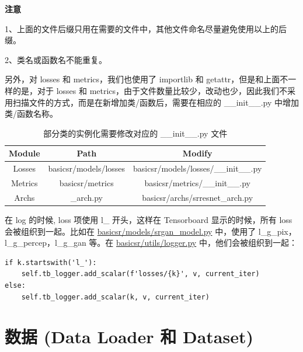 \documentclass[../main.tex]{subfiles}
\begin{document}
\begin{hl} %
    \textbf{注意}

    1、上面的文件后缀只用在需要的文件中，其他文件命名尽量避免使用以上的后缀。

    2、类名或函数名不能重复。
\end{hl}

另外，对 losses 和 metrics，我们也使用了 importlib 和 getattr，但是和上面不一样的是，对于 losses 和 metrics，由于文件数量比较少，改动也少，因此我们不采用扫描文件的方式，而是在新增加类/函数后，需要在相应的 \_\_init\_\_.py 中增加类/函数名称。
\begin{table}[h]
    \centering
    \begin{tabular}{|c|c|c|}
        \hline
        \textbf{Module} & \textbf{Path}         & \textbf{Modify}                       \\ \hline
        Losses          & basicsr/models/losses & basicsr/models/losses/\_\_init\_\_.py \\ \hline
        Metrics         & basicsr/metrics       & basicsr/metrics/\_\_init\_\_.py       \\ \hline
        Archs           & \_arch.py             & basicsr/archs/srresnet\_arch.py       \\ \hline
    \end{tabular}
    \caption{部分类的实例化需要修改对应的 \_\_init\_\_.py 文件}
\end{table}

在 log 的时候, loss 项使用 l\_ 开头，这样在 Tensorboard 显示的时候，所有 loss 会被组织到一起。比如在 \href{https://github.com/XPixelGroup/BasicSR/blob/master/basicsr/models/srgan_model.py}{basicsr/models/srgan\_model.py} 中，使用了 l\_g\_pix，l\_g\_percep，l\_g\_gan 等。在 \href{https://github.com/XPixelGroup/BasicSR/blob/master/basicsr/utils/logger.py}{basicsr/utils/logger.py} 中，他们会被组织到一起：
\begin{verbatim}
if k.startswith('l_'):
    self.tb_logger.add_scalar(f'losses/{k}', v, current_iter)
else:
    self.tb_logger.add_scalar(k, v, current_iter)
\end{verbatim}

\section{数据 (Data Loader 和 Dataset)}\label{code_structure:data}
\end{document}
